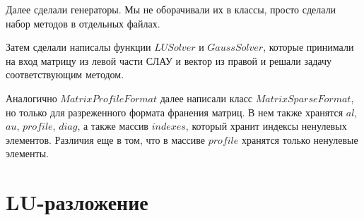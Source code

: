 Далее сделали генераторы. Мы не оборачивали их в классы, просто сделали набор методов в отдельных файлах.

Затем сделали написалы функции $LUSolver$ и $GaussSolver$, которые принимали на вход 
матрицу из левой части СЛАУ и вектор из правой и решали задачу соответствующим методом.

Аналогично $MatrixProfileFormat$ далее написали класс $MatrixSparseFormat$, но только для разреженного формата
франения матриц. В нем также хранятся $al$, $au$, $profile$, $diag$, а также массив $indexes$, 
который хранит индексы ненулевых элементов. Различия еще в том, что 
в массиве $profile$ хранятся только ненулевые элементы.


\section{LU-разложение}